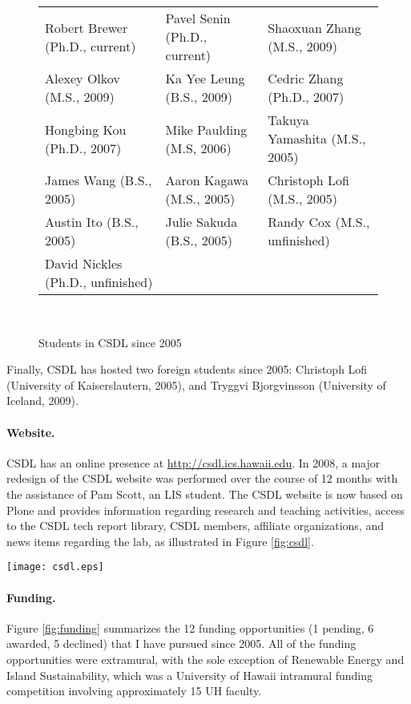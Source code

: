 \documentclass[11pt]{article}
\begin{document}
\begin{figure}[ht]
\small
\begin{tabular}{p{2in}p{2in}p{2in}} \hline
Robert Brewer (Ph.D., current) & Pavel Senin (Ph.D., current)  & Shaoxuan Zhang (M.S., 2009) \\
Alexey Olkov (M.S., 2009) & Ka Yee Leung (B.S., 2009) & Cedric Zhang (Ph.D., 2007) \\
Hongbing Kou (Ph.D., 2007) & Mike Paulding (M.S, 2006)  & Takuya Yamashita (M.S., 2005) \\
James Wang (B.S., 2005) & Aaron Kagawa (M.S., 2005) & Christoph Lofi (M.S., 2005) \\
Austin Ito (B.S., 2005) & Julie Sakuda (B.S., 2005) & Randy Cox (M.S., unfinished) \\
David Nickles (Ph.D., unfinished) & & \\ \hline
\end{tabular} \\ 
\normalsize
\caption{Students in CSDL since 2005}
\label{fig:students}
\end{figure}

Finally, CSDL has hosted two foreign students since 2005: Christoph Lofi (University of Kaiserslautern, 2005), and Tryggvi Bjorgvinsson (University of Iceland, 2009). 

\paragraph{Website.} CSDL has an online presence at \url{http://csdl.ics.hawaii.edu}. In 2008, a major redesign of the CSDL website was performed over the course of 12 months with the assistance of Pam Scott, an LIS student.  The CSDL website is now based on Plone and provides information regarding research and teaching activities, access to the CSDL tech report library, CSDL members, affiliate organizations, and news items regarding the lab, as illustrated in Figure \ref{fig:csdl}.

\begin{figure*}[th]
  \center
  \texttt{[image: csdl.eps]}
  \caption{The CSDL Home Page}
  \label{fig:csdl}
\end{figure*} 

\newpage
\paragraph{Funding.} Figure \ref{fig:funding} summarizes the 12 funding opportunities (1 pending, 6 awarded, 5 declined) that I have pursued since 2005. All of the funding opportunities were extramural, with the sole exception of Renewable Energy and Island Sustainability, which was a University of Hawaii intramural funding competition involving approximately 15 UH faculty. 
\end{document}
